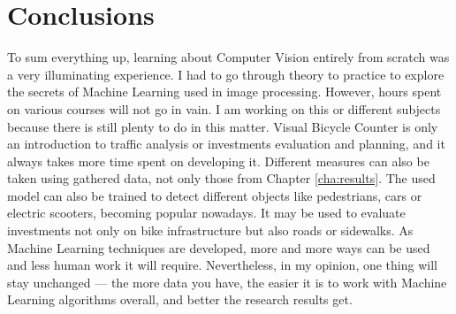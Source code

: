 \chapter{Conclusions}
\label{cha:conclusions}
To sum everything up, learning about Computer Vision entirely from scratch was a very illuminating experience. I had to go through theory to practice to explore the secrets of Machine Learning used in image processing. However, hours spent on various courses will not go in vain. I am working on this or different subjects because there is still plenty to do in this matter. Visual Bicycle Counter is only an introduction to traffic analysis or investments evaluation and planning, and it always takes more time spent on developing it. Different measures can also be taken using gathered data, not only those from Chapter \ref{cha:results}. The used model can also be trained to detect different objects like pedestrians, cars or electric scooters, becoming popular nowadays. It may be used to evaluate investments not only on bike infrastructure but also roads or sidewalks. As Machine Learning techniques are developed, more and more ways can be used and less human work it will require. Nevertheless, in my opinion, one thing will stay unchanged --- the more data you have, the easier it is to work with Machine Learning algorithms overall, and better the research results get.